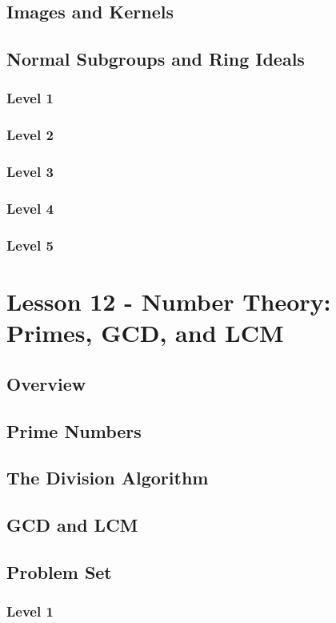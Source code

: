 \documentclass{article}
\begin{document}
\begin{theorem}
\subsection{Images and Kernels}
\subsection{Normal Subgroups and Ring Ideals}
\subsubsection{Level 1}
\subsubsection{Level 2}
\subsubsection{Level 3}
\subsubsection{Level 4}
\subsubsection{Level 5}
\pagebreak

\section{Lesson 12 - Number Theory: Primes, GCD, and LCM}
\subsection{Overview}
\subsection{Prime Numbers}
\subsection{The Division Algorithm}
\subsection{GCD and LCM}
\subsection{Problem Set}
\subsubsection{Level 1}

\end{theorem}
\end{document}
